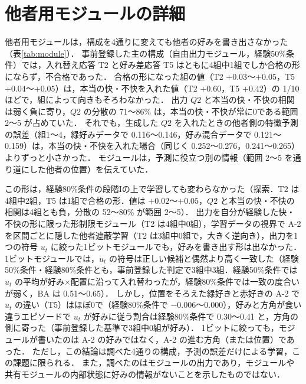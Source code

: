 \section{他者用モジュールの詳細}\label{app:component}
他者用モジュールは，構成を4通りに変えても他者の好みを書き出さなかった（表\ref{tab:module}）．
事前登録した主の構成（自由出力モジュール，経験50\%条件）では，入れ替え応答 T2 と好み差応答 T5 はともに4組中1組でしか合格の形にならず，不合格であった．
合格の形になった組の値（T2 $+0.03$〜$+0.05$，T5 $+0.04$〜$+0.05$）は，本当の快・不快を入れた値（T2 $+0.60$，T5 $+0.42$）の 1/10 ほどで，組によって向きもそろわなかった．
出力 $Q2$ と本当の快・不快の相関は弱く負に寄り，$Q2$ の分散の 71〜86\% は，本当の快・不快が常に0である範囲 2〜5 が占めていた．
それでも，生成した $Q2$ を入れたときの他者側の特徴予測の誤差（組1〜4，緑好みデータで 0.116〜0.146，好み混合データで 0.121〜0.159）は，本当の快・不快を入れた場合（同じく 0.252〜0.276，0.241〜0.265）よりずっと小さかった．
モジュールは，予測に役立つ別の情報（範囲 2〜5 を通り道にした他者の位置）を伝えていた．

この形は，経験80\%条件の段階Iの上で学習しても変わらなかった（探索．T2 は4組中2組，T5 は1組で合格の形．値は $+0.02$〜$+0.05$，$Q2$ と本当の快・不快の相関は4組とも負，分散の 52〜80\% が範囲 2〜5）．
出力を自分が経験した快・不快の形に限った形制限モジュール（T2 は4組中0組），学習データの視界で A-2 を区間ごとに隠した他者遮蔽学習（T2 は3組中0組で，大きく逆向き），出力を1つの符号 $u_t$ に絞った1ビットモジュールでも，好みを書き出す形は出なかった．
1ビットモジュールでは，$u_t$ の符号は正しい候補と偶然より高く一致した（経験50\%条件・経験80\%条件とも，事前登録した判定で3組中3組．経験50\%条件では $u_t$ の平均が好み×配置に沿って入れ替わったが，経験80\%条件では一致の度合いが弱く，BA は 0.51〜0.65）．
しかし，位置をそろえた緑好きと赤好きの A-2 で $u_t$ の違い（T5）はほぼ0で（経験80\%条件で $-0.006$〜$0.000$），好みと方角が食い違うエピソードで $u_t$ が好みに従う割合は経験80\%条件で 0.30〜0.41 と，方角の側に寄った（事前登録した基準で3組中0組が好み）．
1ビットに絞っても，モジュールが書いたのは A-2 の好みではなく，A-2 の進む方角（または位置）であった．
ただし，この結論は調べた4通りの構成，予測の誤差だけによる学習，この課題に限られる．
また，調べたのはモジュールの出力であり，モジュールや共有モジュールの内部状態に好みの情報がないことを示したものではない．

